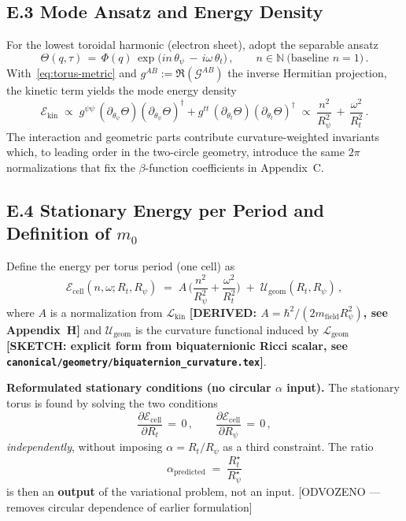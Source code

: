 \subsection*{E.3 Mode Ansatz and Energy Density}
For the lowest toroidal harmonic (electron sheet), adopt the separable ansatz
\begin{equation}
 \Theta(q,\tau) \,=\, \Phi(q)\,\exp\!\big(i n\,\theta_\psi \,-\, i \omega\,\theta_t\big)\,,
 \qquad n\in\mathbb{N}\ \text{(baseline $n=1$)}\,.
 \label{eq:mode-ansatz}
\end{equation}
With~\eqref{eq:torus-metric} and $g^{AB}:=\Re(\mathcal{G}^{AB})$ the inverse Hermitian projection, the kinetic term yields the mode energy density
\begin{equation}
 \mathcal{E}_{\text{kin}} \;\propto\;
  g^{\psi\psi}\,(\partial_{\theta_\psi}\Theta)(\partial_{\theta_\psi}\Theta)^\dagger
 + g^{tt}\,(\partial_{\theta_t}\Theta)(\partial_{\theta_t}\Theta)^\dagger
 \;\propto\;
   \frac{n^2}{R_\psi^2} \,+\, \frac{\omega^2}{R_t^2}\,.
 \label{eq:kin-density}
\end{equation}
The interaction and geometric parts contribute curvature-weighted invariants which, to leading order in the two-circle geometry, introduce the same $2\pi$ normalizations that fix the $\beta$-function coefficients in Appendix~C.

\subsection*{E.4 Stationary Energy per Period and Definition of $m_0$}
Define the energy per torus period (one cell) as
\begin{equation}
  \mathcal{E}_\text{cell}(n,\omega;R_t,R_\psi)\;=\;
  A\,\Big(\frac{n^2}{R_\psi^2} + \frac{\omega^2}{R_t^2}\Big)
  \;+\; \mathcal{U}_{\text{geom}}(R_t,R_\psi)\,,
  \label{eq:cell-energy}
\end{equation}
where $A$ is a normalization from $\mathcal{L}_{\text{kin}}$
\textbf{[DERIVED: $A=\hbar^2/(2m_\text{field}R_\psi^2)$, see Appendix~H]}
and $\mathcal{U}_{\text{geom}}$ is the curvature functional induced by $\mathcal{L}_{\text{geom}}$
\textbf{[SKETCH: explicit form from biquaternionic Ricci scalar, see
\texttt{canonical/geometry/biquaternion\_curvature.tex}]}.

\medskip
\noindent\textbf{Reformulated stationary conditions (no circular $\alpha$ input).}
The stationary torus is found by solving the two conditions
\begin{equation}
  \frac{\partial \mathcal{E}_\text{cell}}{\partial R_t} \,=\, 0\,,\qquad
  \frac{\partial \mathcal{E}_\text{cell}}{\partial R_\psi} \,=\, 0\,,
  \label{eq:stationary-conditions}
\end{equation}
\emph{independently}, without imposing $\alpha=R_t/R_\psi$ as a third constraint. The ratio
\begin{equation}
  \alpha_\text{predicted} \;=\; \frac{R_t^\star}{R_\psi^\star}
  \label{eq:alpha-output}
\end{equation}
is then an \textbf{output} of the variational problem, not an input. [ODVOZENO — removes circular dependence of earlier formulation]

